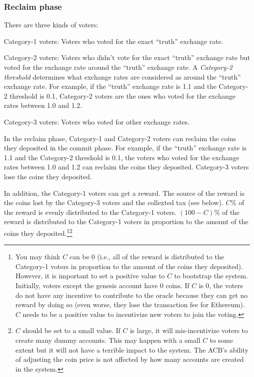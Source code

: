 \documentclass[dvipdfmx,a4paper]{article}
\begin{document}
\subsubsection{Reclaim phase}

There are three kinds of voters:

\begin{description}
\item{Category-1 voters}: Voters who voted for the exact ``truth'' exchange rate.
\item{Category-2 voters}: Voters who didn't vote for the exact ``truth'' exchange rate but voted for the exchange rate around the ``truth'' exchange rate. A \textit{Category-2 threshold} determines what exchange rates are considered as around the ``truth'' exchange rate. For example, if the ``truth'' exchange rate is 1.1 and the Category-2 threshold is 0.1, Category-2 voters are the ones who voted for the exchange rates between 1.0 and 1.2.
\item{Category-3 voters}: Voters who voted for other exchange rates.
\end{description}

In the reclaim phase, Category-1 and Category-2 voters can reclaim the coins they deposited in the commit phase. For example, if the ``truth'' exchange rate is 1.1 and the Category-2 threshold is 0.1, the voters who voted for the exchange rates between 1.0 and 1.2 can reclaim the coins they deposited. Category-3 voters lose the coins they deposited.

In addition, the Category-1 voters can get a reward. The source of the reward is the coins lost by the Category-3 voters and the collexted tax (see below). $C$\% of the reward is evenly distributed to the Category-1 voters. $(100-C)$\% of the reward is distributed to the Category-1 voters in proportion to the amount of the coins they deposited.\footnote{You may think $C$ can be 0 (i.e., all of the reward is distributed to the Category-1 voters in proportion to the amount of the coins they deposited). However, it is important to set a positive value to $C$ to bootstrap the system. Initially, voters except the genesis account have 0 coins. If $C$ is 0, the voters do not have any incentive to contribute to the oracle because they can get no reward by doing so (even worse, they lose the transaction fee for Ethereum). $C$ needs to be a positive value to incentivize new voters to join the voting.}\footnote{$C$ should be set to a small value. If $C$ is large, it will mis-incentivize voters to create many dummy accounts. This may happen with a small $C$ to some extent but it will not have a terrible impact to the system. The ACB's ability of adjusting the coin price is not affected by how many accounts are created in the system.}
\end{document}
